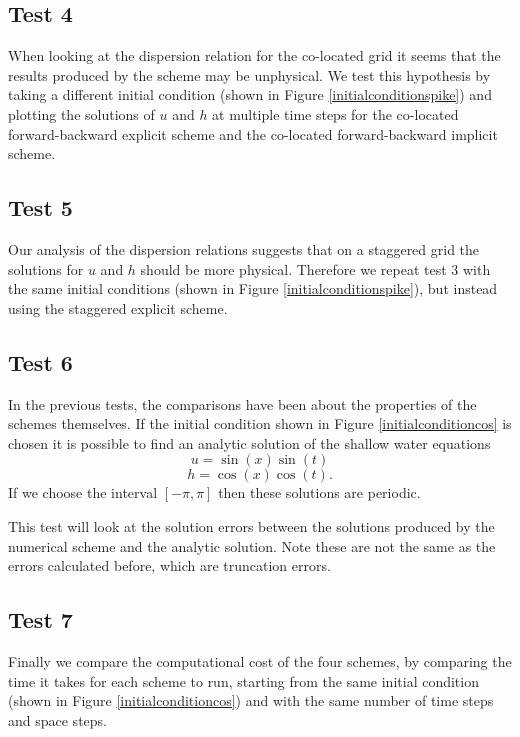 \documentclass[a4paper,12pt, notitlepage]{article}
\begin{document}
\subsection{Test 4}
When looking at the dispersion relation for the co-located grid it seems that the results produced by the scheme may be unphysical. We test this hypothesis by taking a different initial condition (shown in Figure \ref{initialconditionspike}) and plotting the solutions of $u$ and $h$ at multiple time steps for the co-located forward-backward explicit scheme and the co-located forward-backward implicit scheme.

\subsection{Test 5}
Our analysis of the dispersion relations suggests that on a staggered grid the solutions for $u$ and $h$ should be more physical. Therefore we repeat test 3 with the same initial conditions (shown in Figure \ref{initialconditionspike}), but instead using the staggered explicit scheme.

\subsection{Test 6}
In the previous tests, the comparisons have been about the properties of the schemes themselves. If the initial condition shown in Figure \ref{initialconditioncos} is chosen it is possible to find an analytic solution of the shallow water equations
\begin{equation}
u = \sin(x)\sin(t)
\end{equation}
\begin{equation}
h = \cos(x)\cos(t).
\end{equation}
If we choose the interval $[-\pi, \pi]$ then these solutions are periodic.

This test will look at the solution errors between the solutions produced by the numerical scheme and the analytic solution. Note these are not the same as the errors calculated before, which are truncation errors. 


\subsection{Test 7}
Finally we compare the computational cost of the four schemes, by comparing the time it takes for each scheme to run, starting from the same initial condition (shown in Figure \ref{initialconditioncos}) and with the same number of time steps and space steps.
\end{document}
